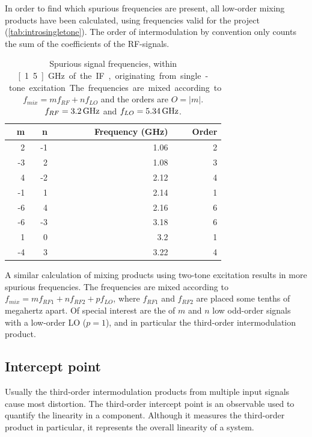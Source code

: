 			In order to find which spurious frequencies are present, all low-order mixing products have been calculated, using frequencies valid for the project (\autoref{tab:introsingletone}). %
			The order of intermodulation by convention only counts the sum of the coefficients of the RF-signals.
		
			\begin{table}[hbt!]
				\caption[Single-tone spurious signals.]{Spurious signal frequencies, within \unit[1.5]{GHz} of the IF, originating from single-tone excitation. The frequencies are mixed according to $f_{mix} = mf_{RF} + nf_{LO}$ and the orders are $O=|m|$. $ f_{RF}=\unit[3.2]{GHz}$ and $ f_{LO}=\unit[5.34]{GHz}$.}
				\label{tab:introsingletone}
				\centering
				\begin{tabular}{rrrr}
					m & n & Frequency (GHz) & Order \\\hline
					  2 &  -1 & 1.06 & 2 \\
					 -3 &   2 & 1.08 & 3 \\
					  4 &  -2 & 2.12 & 4 \\
					 -1 &   1 & 2.14 & 1 \\
					 -6 &   4 & 2.16 & 6 \\
					 -6 &  -3 & 3.18 & 6 \\
					  1 &   0 &  3.2 & 1 \\
					 -4 &   3 & 3.22 & 4
				\end{tabular}
			\end{table}

			A similar calculation of mixing products using two-tone excitation results in more spurious frequencies. The frequencies are mixed according to $f_{mix} = mf_{RF1} + nf_{RF2} + pf_{LO}$, where $f_{RF1}$ and $f_{RF2}$ are placed some tenths of megahertz apart. Of special interest are the of $m$ and $n$ low odd-order signals with a low-order LO ($p=1$), and in particular the third-order intermodulation product.

		\subsection{Intercept point} \label{sec:ip3}
			Usually the third-order intermodulation products from multiple input signals cause most distortion. The third-order intercept point is an observable used to quantify the linearity in a component. Although it measures the third-order product in particular, it represents the overall linearity of a system.

